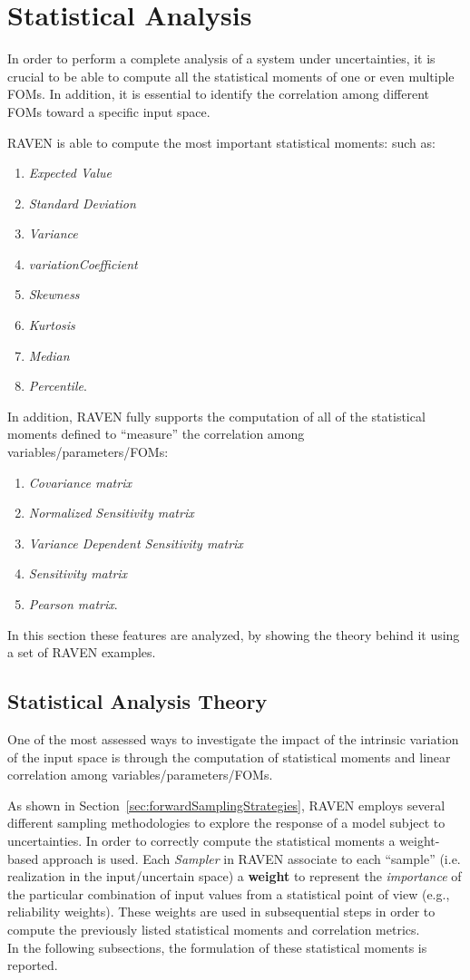 \section{Statistical Analysis}
\label{sec:statisticalAnalysis}
In order to perform a complete analysis of a system under uncertainties,
it is crucial to be able to compute all the statistical moments of one or even multiple
FOMs. In addition, it is essential to identify the correlation
among different FOMs toward a specific input space. 

RAVEN is able to compute the most important statistical moments:
such as:
\begin{enumerate}
  \item \textit{Expected Value}
  \item \textit{Standard Deviation}
  \item \textit{Variance}
  \item \textit{variationCoefficient}
  \item \textit{Skewness}
  \item \textit{Kurtosis}
  \item \textit{Median}
  \item \textit{Percentile}.
\end{enumerate} 
In addition, RAVEN fully supports the computation of all of the statistical moments defined to
``measure'' the correlation among variables/parameters/FOMs:
\begin{enumerate}
  \item \textit{Covariance matrix}
  \item \textit{Normalized Sensitivity  matrix}
  \item \textit{Variance Dependent Sensitivity  matrix}
  \item \textit{Sensitivity matrix}
  \item \textit{Pearson matrix}.
\end{enumerate} 
In this section these features are analyzed, by showing the theory behind it
using a set of RAVEN examples.
\subsection{Statistical Analysis Theory}
One of the most assessed ways to investigate the impact of the intrinsic variation of the input space is through the computation of 
statistical moments and linear correlation among variables/parameters/FOMs. 

As shown in Section~\ref{sec:forwardSamplingStrategies}, RAVEN employs several different sampling methodologies to explore the response of a model subject to uncertainties. In order to correctly compute the statistical moments a weight-based approach is used. Each \textit{Sampler} in RAVEN associate to each ``sample'' (i.e.
realization in the input/uncertain space) a \textbf{weight}  to represent the \textit{importance} of the particular
combination of input values from a statistical point of view (e.g., reliability weights). These weights are used in subsequential
steps in order to compute the previously listed statistical moments and correlation metrics.
\\In the following subsections, the formulation of these statistical moments is reported.
